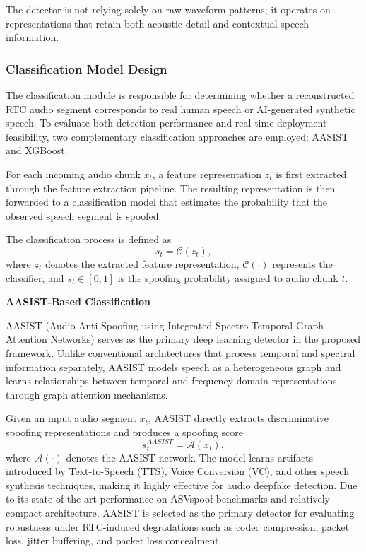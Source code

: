The detector is not relying solely on raw waveform patterns; it operates on representations that retain both acoustic detail and contextual speech information.

\subsubsection{Classification Model Design}

The classification module is responsible for determining whether a reconstructed RTC audio segment corresponds to real human speech or AI-generated synthetic speech. To evaluate both detection performance and real-time deployment feasibility, two complementary classification approaches are employed: AASIST and XGBoost.

For each incoming audio chunk $x_t$, a feature representation $z_t$ is first extracted through the feature extraction pipeline. The resulting representation is then forwarded to a classification model that estimates the probability that the observed speech segment is spoofed.

The classification process is defined as
\begin{equation}
s_t = \mathcal{C}(z_t),
\end{equation}
where $z_t$ denotes the extracted feature representation, $\mathcal{C}(\cdot)$ represents the classifier, and $s_t \in [0,1]$ is the spoofing probability assigned to audio chunk $t$.

\textbf{AASIST-Based Classification}

AASIST (Audio Anti-Spoofing using Integrated Spectro-Temporal Graph Attention Networks) serves as the primary deep learning detector in the proposed framework. Unlike conventional architectures that process temporal and spectral information separately, AASIST models speech as a heterogeneous graph and learns relationships between temporal and frequency-domain representations through graph attention mechanisms.

Given an input audio segment $x_t$, AASIST directly extracts discriminative spoofing representations and produces a spoofing score
\begin{equation}
s_t^{AASIST} = \mathcal{A}(x_t),
\end{equation}
where $\mathcal{A}(\cdot)$ denotes the AASIST network. The model learns artifacts introduced by Text-to-Speech (TTS), Voice Conversion (VC), and other speech synthesis techniques, making it highly effective for audio deepfake detection. Due to its state-of-the-art performance on ASVspoof benchmarks and relatively compact architecture, AASIST is selected as the primary detector for evaluating robustness under RTC-induced degradations such as codec compression, packet loss, jitter buffering, and packet loss concealment.

